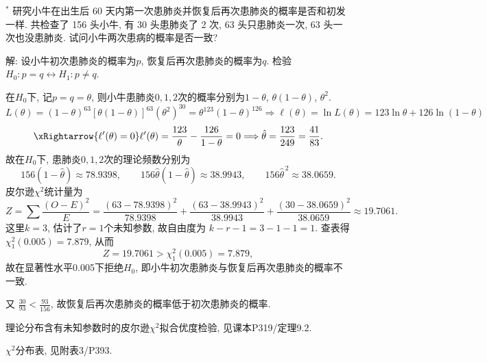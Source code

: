 \documentclass[standard]{ExBook}
\renewenvironment{shaded}{%
  \def\FrameCommand{\fboxsep=\FrameSep \colorbox{shadecolor}}%
  \MakeFramed{\advance\hsize-\width \FrameRestore}%
}{%
  \endMakeFramed
}
\begin{document}
\begin{qitems}
    \begin{bbox}
    \begin{shaded}
        \qitem$^*$
研究小牛在出生后 60 天内第一次患肺炎并恢复后再次患肺炎的概率是否和初发一样. 共检查了 156 头小牛, 有 30 头患肺炎了 2 次, 63 头只患肺炎一次, 63 头一次也没患肺炎. 试问小牛两次患病的概率是否一致?
    \end{shaded}
    \end{bbox}

\vspace{\dimexpr2.5cm-5em\relax}

解: 设小牛初次患肺炎的概率为$p$, 恢复后再次患肺炎的概率为$q$. 检验
$
H_0:p=q
\leftrightarrow
H_1:p\neq q
$.

在$H_0$下, 记$p=q=\theta$, 则小牛患肺炎$0,1,2$次的概率分别为$1-\theta$, $\theta(1-\theta)$, $\theta^2$.
$$
L(\theta)
=(1-\theta)^{63}[\theta(1-\theta)]^{63}(\theta^2)^{30}
=\theta^{123}(1-\theta)^{126}
\Longrightarrow
\ell(\theta)
=\ln L(\theta)
=123\ln\theta+126\ln(1-\theta)
$$
$$
\xRightarrow{\ell'(\theta)=0}
\ell'(\theta)
=\frac{123}{\theta}-\frac{126}{1-\theta}=0
\Longrightarrow
\hat{\theta}=\frac{123}{249}=\frac{41}{83}.
$$
故在$H_0$下, 患肺炎$0,1,2$次的理论频数分别为
$$
156(1-\hat{\theta})\approx78.9398,\qquad
156\hat{\theta}(1-\hat{\theta})\approx38.9943,\qquad
156\hat{\theta}^{\,2}\approx38.0659.
$$
皮尔逊$\chi^2$统计量为
$$
Z
=\sum\frac{(O-E)^2}{E}
=\frac{(63-78.9398)^2}{78.9398}
+\frac{(63-38.9943)^2}{38.9943}
+\frac{(30-38.0659)^2}{38.0659}
\approx19.7061.
$$
这里$k=3$, 估计了$r=1$个未知参数, 故自由度为
$
k-r-1=3-1-1=1
$.
查表得
$
\chi_1^2(0.005)=7.879
$,
从而
$$
Z=19.7061>\chi_1^2(0.005)=7.879,
$$
故在显著性水平0.005下拒绝$H_0$, 即小牛初次患肺炎与恢复后再次患肺炎的概率不一致.

又
$
\frac{30}{93}<\frac{93}{156}
$,
故恢复后再次患肺炎的概率低于初次患肺炎的概率.

\textcolor{themeColor}{\selectfont {} 理论分布含有未知参数时的皮尔逊$\chi^2$拟合优度检验, 见课本P319/定理9.2.}

\textcolor{themeColor}{\selectfont {} $\chi^2$分布表, 见附表3/P393.}

\vspace{2.5cm-5em}


\end{qitems}
\end{document}
